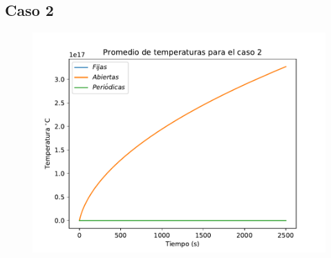 \documentclass[12pt,letterpaper]{article}
\begin{document}
\subsection*{Caso 2}

\begin{figure}[H]
\includegraphics{prom2.pdf}
\centering
\end{figure}


\vspace{0.3cm}
\end{document}
